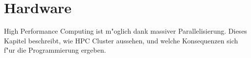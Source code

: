 \chapter{Hardware\label{chapter-hardware}}
High Performance Computing ist m"oglich dank massiver Parallelisierung.
Dieses Kapitel beschreibt, wie HPC Cluster aussehen, und welche Konsequenzen
sich f"ur die Programmierung ergeben.
